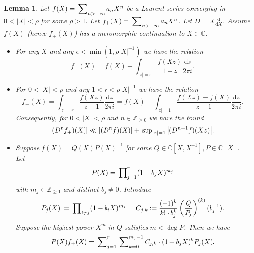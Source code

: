 \documentclass[A4]{amsart}
\def\geq{\geqslant}
\newtheorem{lemma}      [theorem]{Lemma}
\numberwithin{equation}{section} \everymath{\displaystyle}
\newcommand{\Z}{\mathbb{Z}}
\newcommand{\ud}{\mathrm{d}}
\newcommand{\C}{\mathbb{C}}
\newcommand{\norm}[1][\cdot]{\lvert #1 \rvert}
\newcommand{\extnorm}[1]{\left\lvert #1 \right\rvert}
\begin{document}
\begin{lemma} \label{lem: LaurentTruncF}
	Let $f(X) = \sideset{}{_{n > -\infty}} \sum a_n X^n$ be a Laurent series converging in $0 < \norm[X] < \rho$ for some $\rho > 1$. Let $f_+(X) = \sideset{}{_{n > -\infty}} \sum a_n X^n$. Let $D = X \tfrac{\ud}{\ud X}$. Assume $f(X)$ (hence $f_+(X)$) has a meromorphic continuation to $X \in \C$. 
\begin{itemize}
	\item[(0)] For any $X$ and any $\epsilon < \min(1, \rho \norm[X]^{-1})$ we have the relation
	$$ f_+(X) = f(X) - \int_{\norm[z]=\epsilon} \frac{f(Xz)}{1-z} \frac{\ud z}{2\pi i}. $$
	\item[(1)] For $0 < \norm[X] < \rho$ and any $1<r<\rho \norm[X]^{-1}$ we have the relation
	$$ f_+(X) = \int_{\norm[z]=r} \frac{f(Xz)}{z-1} \frac{\ud z}{2\pi i} = f(X) + \int_{\norm[z]=1} \frac{f(Xz)-f(X)}{z-1} \frac{\ud z}{2\pi i}. $$
	Consequently, for $0 < \norm[X] < \rho$ and $n \in \Z_{\geq 0}$ we have the bound
	$$ \extnorm{(D^n f_+)(X)} \ll \extnorm{(D^n f)(X)} + \sideset{}{_{\norm[z]=1}} \sup \extnorm{(D^{n+1} f)(Xz)}. $$
	\item[(2)] Suppose $f(X) = Q(X) P(X)^{-1}$ for some $Q \in \C[X,X^{-1}], P \in \C[X]$. Let
	$$ P(X) = \sideset{}{_{j=1}^r} \prod (1-b_j X)^{m_j} $$
	with $m_j \in \Z_{\geq 1}$ and distinct $b_j \neq 0$. Introduce
	$$ P_j(X) := \sideset{}{_{i \neq j}} \prod (1-b_i X)^{m_i}, \quad C_{j,k} := \frac{(-1)^k}{k! \cdot b_j^k} \left( \frac{Q}{P_j} \right)^{(k)}(b_j^{-1}). $$
	Suppose the highest power $X^m$ in $Q$ satisfies $m < \deg P$. Then we have
	$$ P(X) f_+(X) = \sideset{}{_{j=1}^r} \sum \sideset{}{_{k=0}^{m_j-1}} \sum C_{j,k} \cdot (1-b_jX)^k P_j(X). $$
\end{itemize}
\end{lemma}
\end{document}
